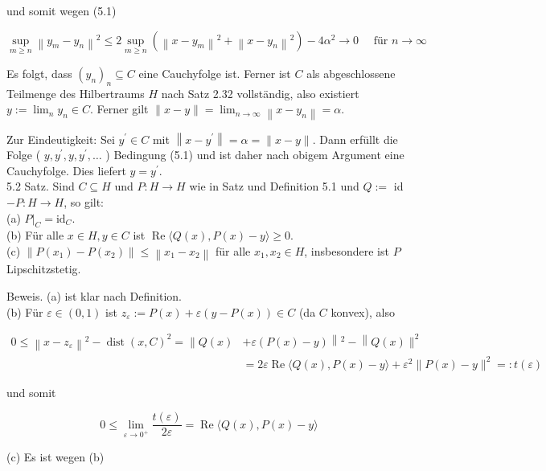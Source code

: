 \documentclass[10pt, letterpaper]{article}
\begin{document}
und somit wegen (5.1)

$$
\sup _{m \geq n}\left\|y_{m}-y_{n}\right\|^{2} \leq 2 \sup _{m \geq n}\left(\left\|x-y_{m}\right\|^{2}+\left\|x-y_{n}\right\|^{2}\right)-4 \alpha^{2} \rightarrow 0 \quad \text { für } n \rightarrow \infty
$$

Es folgt, dass $\left(y_{n}\right)_{n} \subseteq C$ eine Cauchyfolge ist. Ferner ist $C$ als abgeschlossene Teilmenge des Hilbertraums $H$ nach Satz 2.32 vollständig, also existiert $y:=\lim _{n} y_{n} \in C$. Ferner gilt $\|x-y\|=\lim _{n \rightarrow \infty}\left\|x-y_{n}\right\|=\alpha$.

Zur Eindeutigkeit: Sei $y^{\prime} \in C$ mit $\left\|x-y^{\prime}\right\|=\alpha=\|x-y\|$. Dann erfüllt die Folge ( $y, y^{\prime}, y, y^{\prime}, \ldots$ ) Bedingung (5.1) und ist daher nach obigem Argument eine Cauchyfolge. Dies liefert $y=y^{\prime}$.\\
5.2 Satz. Sind $C \subseteq H$ und $P: H \rightarrow H$ wie in Satz und Definition 5.1 und $Q:=$ id $-P: H \rightarrow H$, so gilt:\\
(a) $\left.P\right|_{C}=\mathrm{id}_{C}$.\\
(b) Für alle $x \in H, y \in C$ ist $\operatorname{Re}\langle Q(x), P(x)-y\rangle \geq 0$.\\
(c) $\left\|P\left(x_{1}\right)-P\left(x_{2}\right)\right\| \leq\left\|x_{1}-x_{2}\right\|$ für alle $x_{1}, x_{2} \in H$, insbesondere ist $P$ Lipschitzstetig.

Beweis. (a) ist klar nach Definition.\\
(b) Für $\varepsilon \in(0,1)$ ist $z_{\varepsilon}:=P(x)+\varepsilon(y-P(x)) \in C$ (da $C$ konvex), also

$$
\begin{aligned}
0 \leq\left\|x-z_{\varepsilon}\right\|^{2}-\operatorname{dist}(x, C)^{2}=\| Q(x) & +\varepsilon(P(x)-y)\left\|^{2}-\right\| Q(x) \|^{2} \\
& =2 \varepsilon \operatorname{Re}\langle Q(x), P(x)-y\rangle+\varepsilon^{2}\|P(x)-y\|^{2}=: t(\varepsilon)
\end{aligned}
$$

und somit

$$
0 \leq \lim _{\varepsilon \rightarrow 0^{+}} \frac{t(\varepsilon)}{2 \varepsilon}=\operatorname{Re}\langle Q(x), P(x)-y\rangle
$$

(c) Es ist wegen (b)
\end{document}
